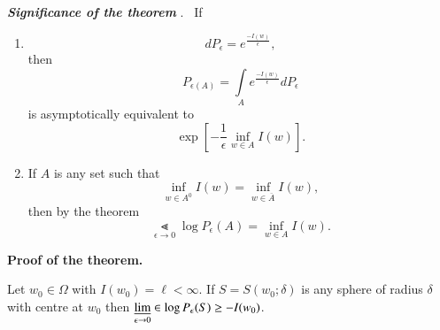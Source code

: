\noindent
\textbf{\textit{Significance of the theorem }}.~ If
\begin{enumerate}
\item
$$
dP_{\epsilon}=e^{\frac{-I(w)}{\epsilon}},
$$
then
$$
P_{\epsilon(A)}=\int\limits_{A}e^{\frac{-I(w)}{\epsilon}}dP_{\epsilon}
$$
is asymptotically equivalent to
$$
\exp[-\frac{1}{\epsilon}\inf\limits_{w\in A}I(w)].
$$

\item If $A$ is any set such that
$$
\inf\limits_{w\in A^{0}}I(w)=\inf\limits_{w\in \overline{A}}I(w),
$$
then by the theorem
$$
\Lt\limits_{\epsilon\to 0}\log P_{\epsilon}(A)=\inf\limits_{w\in
  A}I(w).
$$
\end{enumerate}

\noindent
{\bf Proof of the theorem.}\pageoriginale

\setcounter{lemma}{0}
\begin{lemma}\label{chap22-lem1}
Let $w_{0}\in \Omega$ with $I(w_{0})=\ell<\infty$. If
$S=S(w_{0};\delta)$ is any sphere of radius $\delta$ with centre at
$w_{0}$ then $\varliminf\limits_{\epsilon\to 0}\in \log
P_{\epsilon}(S)\geq -I(w_{0})$. 
\end{lemma}

